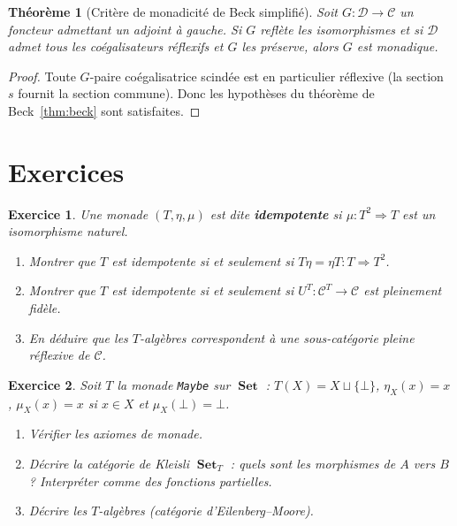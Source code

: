 \documentclass[a4paper,12pt]{book}
\DeclareMathOperator{\Set}{\mathbf{Set}}
\newtheorem{theoreme}{Théorème}[chapter]
\newtheorem{exercice}{Exercice}[chapter]
\begin{document}
\begin{theoreme}[Critère de monadicité de Beck simplifié]%
\label{thm:beck-simplifie}
Soit $G \colon \mathcal{D} \to \mathcal{C}$ un foncteur admettant un
adjoint à gauche. Si $G$ reflète les isomorphismes et si $\mathcal{D}$
admet tous les coégalisateurs réflexifs
et $G$ les préserve, alors $G$ est monadique.
\end{theoreme}

\begin{proof}
Toute $G$-paire coégalisatrice scindée est en particulier réflexive
(la section $s$ fournit la section commune). Donc les hypothèses du
théorème de Beck~\ref{thm:beck} sont satisfaites.
\end{proof}


\section{Exercices}\label{sec:exo-monades}

\begin{exercice}\label{exo:monade-idempotente}
Une monade $(T, \eta, \mu)$ est dite \textbf{idempotente} si
$\mu \colon T^2 \Rightarrow T$ est un isomorphisme naturel.
\begin{enumerate}[label=(\alph*)]
\item Montrer que $T$ est idempotente si et seulement si
    $T\eta = \eta T \colon T \Rightarrow T^2$.
\item Montrer que $T$ est idempotente si et seulement si
    $U^T \colon \mathcal{C}^T \to \mathcal{C}$ est pleinement fidèle.
\item En déduire que les $T$-algèbres correspondent à une
    sous-catégorie pleine réflexive de $\mathcal{C}$.
\end{enumerate}
\end{exercice}

\begin{exercice}\label{exo:kleisli-informatique}
Soit $T$ la monade \texttt{Maybe} sur $\Set$ :
$T(X) = X \sqcup \{\bot\}$, $\eta_X(x) = x$,
$\mu_X(x) = x$ si $x \in X$ et $\mu_X(\bot) = \bot$.
\begin{enumerate}[label=(\alph*)]
\item Vérifier les axiomes de monade.
\item Décrire la catégorie de Kleisli $\Set_T$ : quels sont les morphismes
    de $A$ vers $B$ ? Interpréter comme des fonctions partielles.
\item Décrire les $T$-algèbres (catégorie d'Eilenberg--Moore).
\end{enumerate}
\end{exercice}
\end{document}
